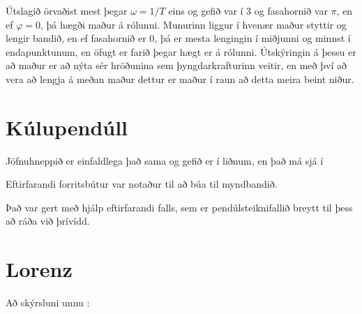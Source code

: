 \documentclass[a4]{article}
\begin{document}
  Útslagið örvaðist mest þegar $\omega = 1/T$ eins og gefið var í 3 og fasahornið var $\pi$,
  en ef $\varphi = 0$, þá hægði maður á rólunni. Munurinn liggur í hvenær maður styttir og lengir bandið, en ef fasahornið er 0, þá er mesta lengingin í miðjunni og minnst í endapunktunum,
  en öfugt er farið þegar hægt er á rólunni. Útskýringin á þessu er að maður er að nýta sér  hröðunina sem þyngdarkrafturinn veitir, en með því að vera að lengja á meðan maður dettur er maður í raun að detta meira beint niður.
\section{Kúlupendúll}
 Jöfnuhneppið er einfaldlega það sama og gefið er í liðnum, en það má sjá í 


 Eftirfarandi forritsbútur var notaður til að búa til myndbandið.

 Það var gert með hjálp eftirfarandi falls, sem er pendúlsteiknifallið breytt til þess að ráða við þrívídd.


\section{Lorenz}
\vspace{20 mm}
Að skýrsluni unnu :
\hspace{0.5cm} \makebox[1.5in]{\hrulefill}
\hspace{0.5cm} \makebox[1.5in]{\hrulefill}
\hspace{0.5cm} \makebox[1.5in]{\hrulefill}
\end{document}
